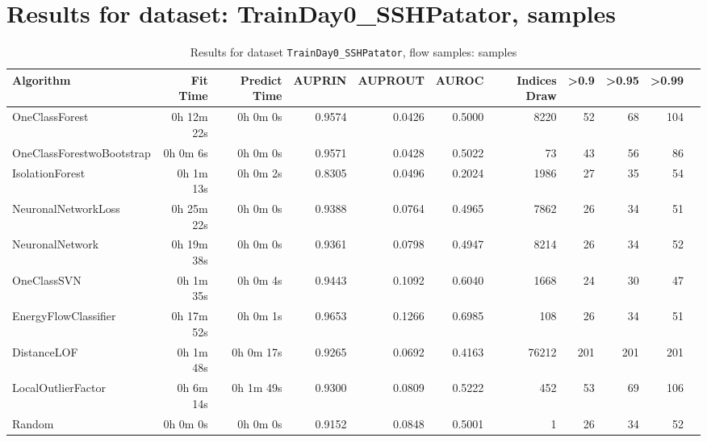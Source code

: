 \documentclass{article}
\begin{document}
\section*{Results for dataset: TrainDay0_SSHPatator, samples}
\begin{table}[h!]
\centering
\caption{Results for dataset \texttt{TrainDay0_SSHPatator}, flow samples: samples}
\label{tab:trainday0sshpatator_samples}
\begin{tabular}{lrrrrrrrrrr}
\toprule
Algorithm & Fit Time & Predict Time & AUPRIN & AUPROUT & AUROC & Indices Draw & >0.9 & >0.95 & >0.99 \\
\midrule
OneClassForest & 0h 12m 22s & 0h 0m 0s & 0.9574 & 0.0426 & 0.5000 & 8220 & 52 & 68 & 104 \\
OneClassForestwoBootstrap & 0h 0m 6s & 0h 0m 0s & 0.9571 & 0.0428 & 0.5022 & 73 & 43 & 56 & 86 \\
IsolationForest & 0h 1m 13s & 0h 0m 2s & 0.8305 & 0.0496 & 0.2024 & 1986 & 27 & 35 & 54 \\
NeuronalNetworkLoss & 0h 25m 22s & 0h 0m 0s & 0.9388 & 0.0764 & 0.4965 & 7862 & 26 & 34 & 51 \\
NeuronalNetwork & 0h 19m 38s & 0h 0m 0s & 0.9361 & 0.0798 & 0.4947 & 8214 & 26 & 34 & 52 \\
OneClassSVN & 0h 1m 35s & 0h 0m 4s & 0.9443 & 0.1092 & 0.6040 & 1668 & 24 & 30 & 47 \\
EnergyFlowClassifier & 0h 17m 52s & 0h 0m 1s & 0.9653 & 0.1266 & 0.6985 & 108 & 26 & 34 & 51 \\
DistanceLOF & 0h 1m 48s & 0h 0m 17s & 0.9265 & 0.0692 & 0.4163 & 76212 & 201 & 201 & 201 \\
LocalOutlierFactor & 0h 6m 14s & 0h 1m 49s & 0.9300 & 0.0809 & 0.5222 & 452 & 53 & 69 & 106 \\
Random & 0h 0m 0s & 0h 0m 0s & 0.9152 & 0.0848 & 0.5001 & 1 & 26 & 34 & 52 \\
\bottomrule
\end{tabular}
\end{table}
\end{document}
